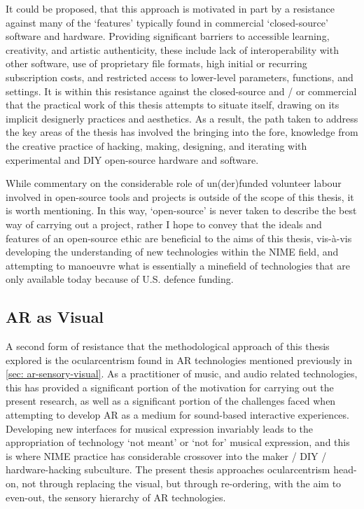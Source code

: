 It could be proposed, that this approach is motivated in part by a resistance against many of the `features' typically found in commercial `closed-source' software and hardware. Providing significant barriers to accessible learning, creativity, and artistic authenticity, these include lack of interoperability with other software, use of proprietary file formats, high initial or recurring subscription costs, and restricted access to lower-level parameters, functions, and settings. It is within this resistance against the closed-source and / or commercial that the practical work of this thesis attempts to situate itself, drawing on its implicit designerly practices and aesthetics. As a result, the path taken to address the key areas of the thesis has involved the bringing into the fore, knowledge from the creative practice of hacking, making, designing, and iterating with experimental and DIY open-source hardware and software.

While commentary on the considerable role of un(der)funded volunteer labour involved in open-source tools and projects is outside of the scope of this thesis, it is worth mentioning. In this way, `open-source' is never taken to describe the best way of carrying out a project, rather I hope to convey that the ideals and features of an open-source ethic are beneficial to the aims of this thesis, vis-à-vis developing the understanding of new technologies within the NIME field, and attempting to manoeuvre what is essentially a minefield of technologies that are only available today because of U.S. defence funding.

\subsection{AR as Visual}\label{sec: method-resistance-ocularcentrism}
A second form of resistance that the methodological approach of this thesis explored is the ocularcentrism found in AR technologies mentioned previously in \autoref{sec: ar-sensory-visual}. As a practitioner of music, and audio related technologies, this has provided a significant portion of the motivation for carrying out the present research, as well as a significant portion of the challenges faced when attempting to develop AR as a medium for sound-based interactive experiences. Developing new interfaces for musical expression invariably leads to the appropriation of technology `not meant' or `not for' musical expression, and this is where NIME practice has considerable crossover into the maker / DIY / hardware-hacking subculture. The present thesis approaches ocularcentrism head-on, not through replacing the visual, but through re-ordering, with the aim to even-out, the sensory hierarchy of AR technologies. 

